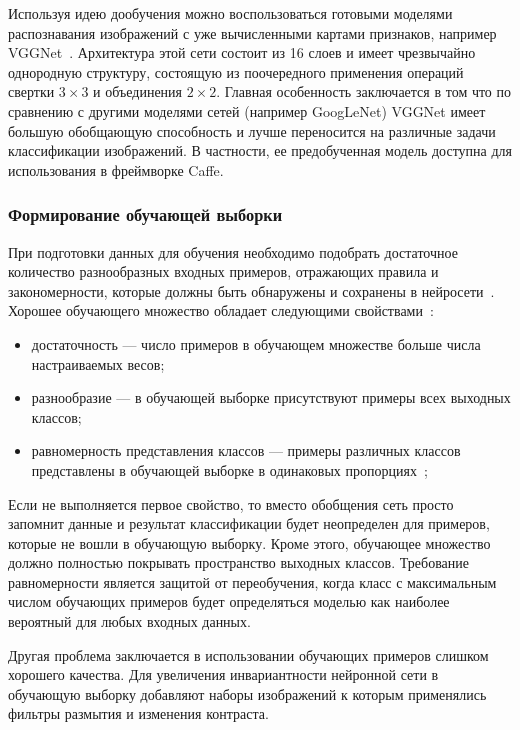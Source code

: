 \documentclass[a4paper,14pt]{extarticle} %
\begin{document}
Используя идею дообучения можно воспользоваться готовыми моделями распознавания изображений с уже вычисленными картами признаков, например VGGNet~\cite{VGGNet}. Архитектура этой сети состоит из 16 слоев и имеет чрезвычайно однородную структуру, состоящую из поочередного применения операций свертки $3 \times 3$ и объединения $2 \times 2$. Главная особенность заключается в том что по сравнению с другими моделями сетей (например GoogLeNet) VGGNet имеет большую обобщающую способность и лучше переносится на различные задачи классификации изображений. В частности, ее предобученная модель доступна для использования в фреймворке Caffe.

\subsubsection{Формирование обучающей выборки}
\hspace{\parindent} При подготовки данных для обучения необходимо подобрать достаточное количество разнообразных входных примеров, отражающих правила и закономерности, которые должны быть обнаружены и сохранены в нейросети~\cite{TrainingData3}. Хорошее обучающего множество обладает следующими свойствами~\cite{TrainingData}:

\begin{itemize}
\item достаточность --- число примеров в обучающем множестве больше числа настраиваемых весов;
\item разнообразие --- в обучающей выборке присутствуют примеры всех выходных классов; 
\item равномерность представления классов --- примеры различных классов представлены в обучающей выборке в одинаковых пропорциях~\cite{TrainingData2}; 
\end{itemize}

Если не выполняется первое свойство, то вместо обобщения сеть просто запомнит данные и результат классификации будет неопределен для примеров, которые не вошли в обучающую выборку. Кроме этого, обучающее множество должно полностью покрывать пространство выходных классов. Требование равномерности является защитой от переобучения, когда класс с максимальным числом обучающих примеров будет определяться моделью как наиболее вероятный для любых входных данных.

Другая проблема заключается в использовании обучающих примеров слишком хорошего качества. Для увеличения инвариантности нейронной сети в обучающую выборку добавляют наборы изображений к которым применялись фильтры размытия и изменения контраста.
\end{document}
